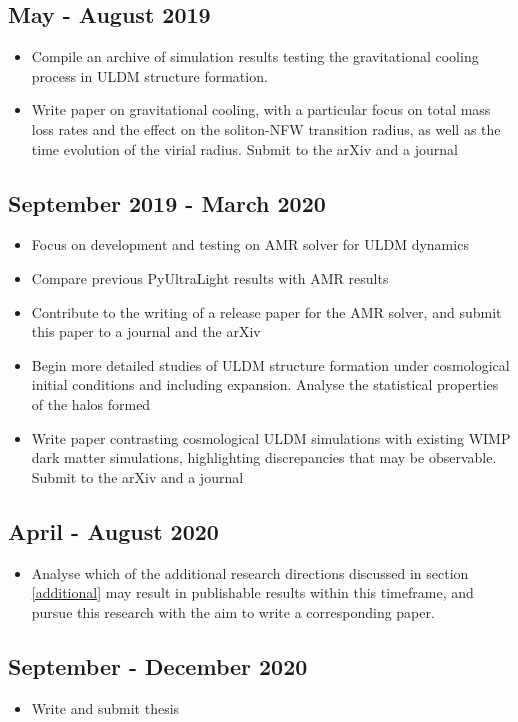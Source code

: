 \subsection*{May - August 2019}
\begin{itemize}
    \item Compile an archive of simulation results testing the gravitational cooling process in ULDM structure formation. 
    \item Write paper on gravitational cooling, with a particular focus on total mass loss rates and the effect on the soliton-NFW transition radius, as well as the time evolution of the virial radius. Submit to the arXiv and a journal
\end{itemize}

\subsection*{September 2019 - March 2020}
\begin{itemize}
    \item Focus on development and testing on AMR solver for ULDM dynamics
    \item Compare previous PyUltraLight results with AMR results
    \item Contribute to the writing of a release paper for the AMR solver, and submit this paper to a journal and the arXiv
    \item Begin more detailed studies of ULDM structure formation under cosmological initial conditions and including expansion. Analyse the statistical properties of the halos formed
    \item Write paper contrasting cosmological ULDM simulations with existing WIMP dark matter simulations, highlighting discrepancies that may be observable. Submit to the arXiv and a journal
\end{itemize}

\subsection*{April - August 2020}
\begin{itemize}
    \item Analyse which of the additional research directions discussed in section \ref{additional} may result in publishable results within this timeframe, and pursue this research with the aim to write a corresponding paper.
\end{itemize}

\subsection*{September - December 2020}
\begin{itemize}
    \item Write and submit thesis
\end{itemize}



